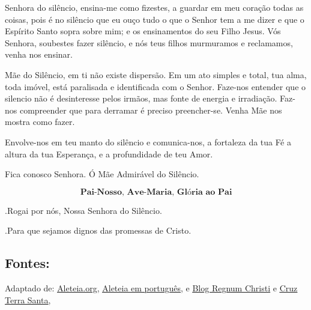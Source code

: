 \documentclass[a4paper,14pt]{extarticle} \usepackage[utf8]{inputenc}
\makeatletter
\newcommand{\vers@resp@sym}{%
  \raisebox{0.2ex}{\rotatebox[origin=c]{-20}{$\m@th\rceil$}}%
}
\newcommand{\vers@resp}[2]{%
  {\ooalign{%
     \hidewidth\kern#1\vers@resp@sym\hidewidth\cr
     #2\cr
  }}%
}
\DeclareRobustCommand{\versicle}{\vers@resp{-0.1em}{V}}
\DeclareRobustCommand{\response}{\vers@resp{0pt}{R}}
\makeatother
\begin{document}
Senhora do silêncio, ensina-me como fizestes, a guardar em meu coração todas as coisas, pois é no silêncio que eu ouço tudo o que o Senhor tem a me dizer e que o Espírito Santo sopra sobre mim; e os ensinamentos do seu Filho Jesus. Vós Senhora, soubestes fazer silêncio, e nós teus filhos murmuramos e reclamamos, venha nos ensinar.

Mãe do Silêncio, em ti não existe dispersão. Em um ato simples e total, tua alma, toda imóvel, está paralisada e identificada com o Senhor. Faze-nos entender que o silencio não é desinteresse pelos irmãos, mas fonte de energia e irradiação. Faz-nos compreender que para derramar é preciso preencher-se. Venha Mãe nos mostra como fazer.

Envolve-nos em teu manto do silêncio e comunica-nos, a fortaleza da tua Fé a altura da tua Esperança, e a profundidade de teu Amor.

Fica conosco Senhora. Ó Mãe Admirável do Silêncio.


\[
  \textbf{Pai-Nosso, Ave-Maria, Glória ao Pai}
\]

\response.\quad Rogai por nós, Nossa Senhora do Silêncio.

\versicle.\quad Para que sejamos dignos das promessas de Cristo.


\vfill

\begin{center}
\subsection*{Fontes:}
Adaptado de: \underline{\href{https://aleteia.org/2019/04/16/consecrate-yourself-to-our-lady-of-silence-with-this-prayer/}{Aleteia.org}}, \underline{\href{https://pt.aleteia.org/2017/11/28/por-que-o-papa-levou-nossa-senhora-do-silencio-para-o-vaticano/}{Aleteia em português}}, e  \underline{\href{https://www.regnumchristi.com/en/our-lady-of-silence/}{Blog Regnum Christi}} e \underline{\href{https://cruzterrasanta.com.br/historia-de-nossa-senhora-do-silencio/475/102/}{Cruz Terra Santa}},
\end{center}
\end{document}
